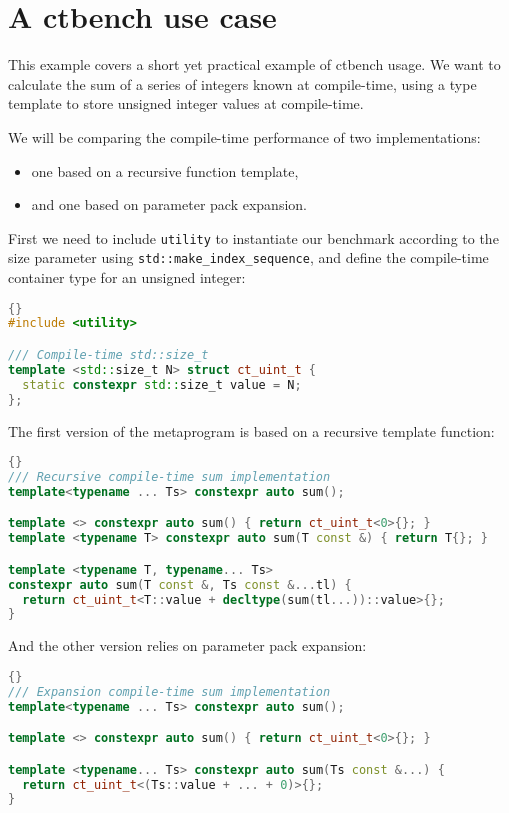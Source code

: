 \documentclass[../main]{subfiles}
\begin{document}
\section{A ctbench use case}

This example covers a short yet practical example of ctbench usage. We want to
calculate the sum of a series of integers known at compile-time, using a type
template to store unsigned integer values at compile-time.

We will be comparing the compile-time performance of two implementations:

\begin{itemize}
\item one based on a recursive function template,
\item and one based on  parameter pack expansion.
\end{itemize}

First we need to include \lstinline{utility} to instantiate our benchmark
according to the size parameter using \lstinline{std::make_index_sequence}, and
define the compile-time container type for an unsigned integer:

\begin{lstlisting}[language=C++]{}
#include <utility>

/// Compile-time std::size_t
template <std::size_t N> struct ct_uint_t {
  static constexpr std::size_t value = N;
};
\end{lstlisting}

The first version of the metaprogram is based on a recursive template function:

\begin{lstlisting}[language=C++]{}
/// Recursive compile-time sum implementation
template<typename ... Ts> constexpr auto sum();

template <> constexpr auto sum() { return ct_uint_t<0>{}; }
template <typename T> constexpr auto sum(T const &) { return T{}; }

template <typename T, typename... Ts>
constexpr auto sum(T const &, Ts const &...tl) {
  return ct_uint_t<T::value + decltype(sum(tl...))::value>{};
}
\end{lstlisting}

And the other version relies on  parameter pack expansion:

\begin{lstlisting}[language=C++]{}
/// Expansion compile-time sum implementation
template<typename ... Ts> constexpr auto sum();

template <> constexpr auto sum() { return ct_uint_t<0>{}; }

template <typename... Ts> constexpr auto sum(Ts const &...) {
  return ct_uint_t<(Ts::value + ... + 0)>{};
}
\end{lstlisting}
\end{document}
